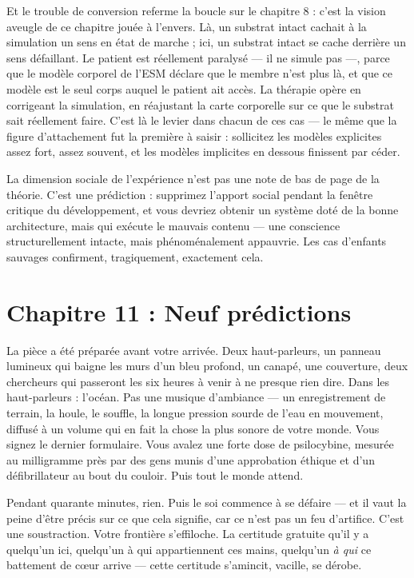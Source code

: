\documentclass[11pt, twoside, openright]{book}
\begin{document}
Et le trouble de conversion referme la boucle sur le chapitre 8 : c'est la vision aveugle de ce chapitre jouée à l'envers. Là, un substrat intact cachait à la simulation un sens en état de marche ; ici, un substrat intact se cache derrière un sens défaillant. Le patient est réellement paralysé --- il ne simule pas ---, parce que le modèle corporel de l'ESM déclare que le membre n'est plus là, et que ce modèle est le seul corps auquel le patient ait accès. La thérapie opère en corrigeant la simulation, en réajustant la carte corporelle sur ce que le substrat sait réellement faire. C'est là le levier dans chacun de ces cas --- le même que la figure d'attachement fut la première à saisir : sollicitez les modèles explicites assez fort, assez souvent, et les modèles implicites en dessous finissent par céder.

La dimension sociale de l'expérience n'est pas une note de bas de page de la théorie. C'est une prédiction : supprimez l'apport social pendant la fenêtre critique du développement, et vous devriez obtenir un système doté de la bonne architecture, mais qui exécute le mauvais contenu --- une conscience structurellement intacte, mais phénoménalement appauvrie. Les cas d'enfants sauvages confirment, tragiquement, exactement cela.


\chapter*{Chapitre 11 : Neuf prédictions}

La pièce a été préparée avant votre arrivée. Deux haut-parleurs, un panneau lumineux qui baigne les murs d'un bleu profond, un canapé, une couverture, deux chercheurs qui passeront les six heures à venir à ne presque rien dire. Dans les haut-parleurs : l'océan. Pas une musique d'ambiance --- un enregistrement de terrain, la houle, le souffle, la longue pression sourde de l'eau en mouvement, diffusé à un volume qui en fait la chose la plus sonore de votre monde. Vous signez le dernier formulaire. Vous avalez une forte dose de psilocybine, mesurée au milligramme près par des gens munis d'une approbation éthique et d'un défibrillateur au bout du couloir. Puis tout le monde attend.

Pendant quarante minutes, rien. Puis le soi commence à se défaire --- et il vaut la peine d'être précis sur ce que cela signifie, car ce n'est pas un feu d'artifice. C'est une soustraction. Votre frontière s'effiloche. La certitude gratuite qu'il y a quelqu'un ici, quelqu'un à qui appartiennent ces mains, quelqu'un \textit{à qui} ce battement de cœur arrive --- cette certitude s'amincit, vacille, se dérobe.
\end{document}

